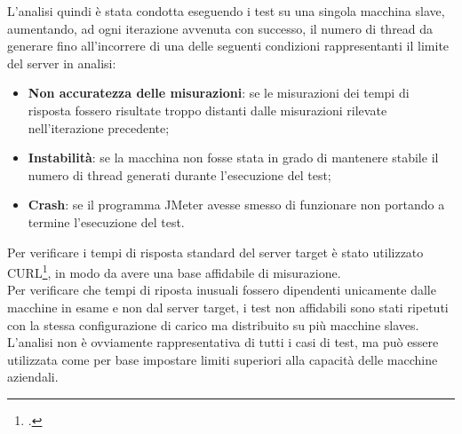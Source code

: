L'analisi quindi è stata condotta eseguendo i test su una singola macchina slave, aumentando, ad ogni iterazione avvenuta con successo, il numero di thread da generare fino all'incorrere di una delle seguenti condizioni rappresentanti il limite del server in analisi:
\begin{itemize}
	\item \textbf{Non accuratezza delle misurazioni}: se le misurazioni dei tempi di risposta fossero risultate troppo distanti dalle misurazioni rilevate nell'iterazione precedente;
	\item \textbf{Instabilità}: se la macchina non fosse stata in grado di mantenere stabile il numero di thread generati durante l'esecuzione del test;
	\item \textbf{Crash}: se il programma JMeter avesse smesso di funzionare non portando a termine l'esecuzione del test.
\end{itemize}
Per verificare i tempi di risposta standard del server target è stato utilizzato CURL\footcite{site:curl}, in modo da avere una base affidabile di misurazione.\\
Per verificare che tempi di riposta inusuali fossero dipendenti unicamente dalle macchine in esame e non dal server target, i test non affidabili sono stati ripetuti con la stessa configurazione di carico ma distribuito su più macchine slaves.\\
L'analisi non è ovviamente rappresentativa di tutti i casi di test, ma può essere utilizzata come per base impostare limiti superiori alla capacità delle macchine aziendali.
